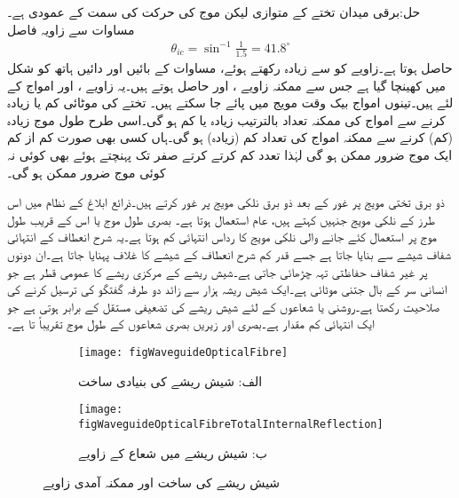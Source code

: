 حل:برقی میدان تختے کے متوازی لیکن موج کی حرکت کی سمت کے عمودی ہے۔مساوات  سے زاویہ فاصل
\begin{align}
\theta_{ic}=\sin^{-1} \frac{1}{1.5}=41.8^{\circ}
\end{align}
حاصل ہوتا ہے۔زاویے کو  سے زیادہ رکھتے  ہوئے، مساوات   کے  بائیں اور دائیں ہاتھ کو شکل  میں کھینچا گیا ہے جس سے ممکنہ زاویے ،  اور  حاصل ہوتے  ہیں۔یہ زاویے ،  اور  امواج کے لئے ہیں۔تینوں امواج بیک وقت مویج میں پائے جا سکتے ہیں۔ تختے کی موٹائی کم یا زیادہ کرنے سے امواج کی ممکنہ تعداد بالترتیب زیادہ یا کم ہو گی۔اسی طرح طول موج زیادہ (کم) کرنے سے ممکنہ امواج کی تعداد کم (زیادہ) ہو گی۔ہاں کسی بھی صورت کم از کم ایک موج ضرور ممکن ہو گی لہٰذا تعدد کم کرتے کرتے صفر تک پہنچتے ہوئے بھی کوئی نہ کوئی موج ضرور ممکن ہو گی۔

ذو برق تختی مویج پر غور کے بعد ذو برق نلکی مویج پر غور کرتے ہیں۔ذرائع ابلاغ کے نظام  میں اس طرز کے نلکی مویج جنہیں  کہتے ہیں،  عام استعمال ہوتا ہے۔ بصری طول موج  یا اس کے قریب طول موج پر استعمال کئے جانے والی نلکی مویج کا رداس انتہائی کم ہوتا ہے۔یہ  شرح  انعطاف کے انتہائی شفاف شیشے سے بنایا جاتا ہے جسے قدر کم  شرح  انعطاف  کے شیشے کا غلاف پہنایا جاتا ہے۔ان دونوں پر غیر شفاف حفاظتی تہہ چڑھائی جاتی ہے۔شیش ریشے کے مرکزی ریشے کا عمومی قطر  ہے جو انسانی سر کے بال جتنی موٹائی ہے۔ایک شیش ریشہ ہزار سے زائد دو طرفہ گفتگو کی ترسیل کرنے کی صلاحیت رکھتا ہے۔روشنی یا  شعاعوں کے لئے شیش ریشے کی تضعیفی مستقل   کے برابر ہوتی ہے جو ایک انتہائی کم مقدار ہے۔بصری اور زیریں بصری شعاعوں کے طول موج تقریباً  تا  ہے۔

\begin{figure}
\centering
\begin{subfigure}{1\textwidth}
\centering
\texttt{[image: figWaveguideOpticalFibre]}
\caption*{الف: شیش ریشے کی بنیادی ساخت}
\end{subfigure}
%
\begin{subfigure}{1\textwidth}
\centering
\texttt{[image: figWaveguideOpticalFibreTotalInternalReflection]}
\caption*{ب: شیش ریشے میں شعاع کے  زاویے}
\end{subfigure}
\caption{شیش ریشے کی ساخت اور ممکنہ آمدی زاویے}
\label{شکل_مویج_شیش_ریشہ}
\end{figure}

